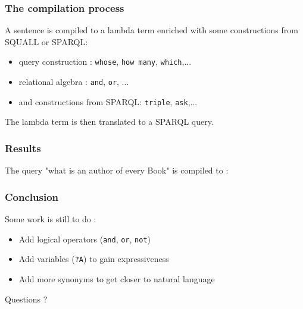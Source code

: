 \documentclass{beamer}
\begin{document}
  \begin{frame}
    \frametitle{The compilation process}
    A sentence is compiled to a lambda term enriched with
    some constructions from SQUALL or SPARQL:
    \begin{itemize}
      \item query construction : \texttt{whose}, \texttt{how many}, \texttt{which},...
      \item relational algebra : \texttt{and}, \texttt{or}, ...
      \item and constructions from SPARQL: \texttt{triple}, \texttt{ask},...
    \end{itemize}

    The lambda term is then translated to a SPARQL query.

  \end{frame}
  \begin{frame}
    \frametitle{Results}
    The query "what is an author of every Book" is compiled to :\\
    \lstI
  \end{frame}
  \begin{frame}
    \frametitle{Conclusion}
    Some work is still to do :
    \begin{itemize}
      \item Add logical operators (\texttt{and}, \texttt{or}, \texttt{not})
      \item Add variables (\texttt{?A}) to gain expressiveness
      \item Add more synonyms to get closer to natural language
    \end{itemize}

  \end{frame}
\begin{frame}
  \centering
  Questions ?
\end{frame}
\end{document}
